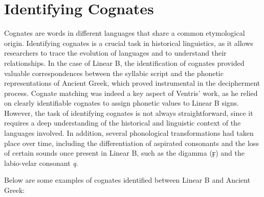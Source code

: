 \section{Identifying Cognates}
Cognates are words in different languages that share a common etymological origin.
Identifying cognates is a crucial task in historical linguistics, as it allows researchers to trace the evolution of languages and to understand their relationships.
In the case of Linear B, the identification of cognates provided valuable correspondences between the syllabic script and the phonetic representations of Ancient Greek, which proved instrumental in the decipherment process.
Cognate matching was indeed a key aspect of Ventris' work, as he relied on clearly identifiable cognates to assign phonetic values to Linear B signs.
However, the task of identifying cognates is not always straightforward, since it requires a deep understanding of the historical and linguistic context of the languages involved.
In addition, several phonological transformations had taken place over time, including the differentiation of aspirated consonants and the loss of certain sounds once present in Linear B, such as the digamma ({\textgreek{ϝ}}) and the labio-velar consonant \textit{q}.

Below are some examples of cognates identified between Linear B and Ancient Greek:  

